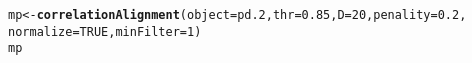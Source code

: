 \documentclass{article}\usepackage[]{graphicx}\usepackage[]{color}
\makeatletter
\newcommand{\hlnum}[1]{\textcolor[rgb]{0.686,0.059,0.569}{#1}}%
\newcommand{\hlstd}[1]{\textcolor[rgb]{0.345,0.345,0.345}{#1}}%
\newcommand{\hlkwb}[1]{\textcolor[rgb]{0.69,0.353,0.396}{#1}}%
\newcommand{\hlkwc}[1]{\textcolor[rgb]{0.333,0.667,0.333}{#1}}%
\newcommand{\hlkwd}[1]{\textcolor[rgb]{0.737,0.353,0.396}{\textbf{#1}}}%
\newenvironment{kframe}{%
 \def\at@end@of@kframe{}%
 \ifinner\ifhmode%
  \def\at@end@of@kframe{\end{minipage}}%
  \begin{minipage}{\columnwidth}%
 \fi\fi%
 \def\FrameCommand##1{\hskip\@totalleftmargin \hskip-\fboxsep
 \colorbox{shadecolor}{##1}\hskip-\fboxsep
     \hskip-\linewidth \hskip-\@totalleftmargin \hskip\columnwidth}%
 \MakeFramed {\advance\hsize-\width
   \@totalleftmargin\z@ \linewidth\hsize
   \@setminipage}}%
 {\par\unskip\endMakeFramed%
 \at@end@of@kframe}
\newenvironment{knitrout}{}{} %
\makeatother
\begin{document}
\begin{knitrout}
\color{fgcolor}\begin{kframe}
\begin{alltt}
\hlstd{mp} \hlkwb{<-} \hlkwd{correlationAlignment}\hlstd{(}\hlkwc{object}\hlstd{=pd.2,} \hlkwc{thr}\hlstd{=}\hlnum{0.85}\hlstd{,} \hlkwc{D}\hlstd{=}\hlnum{20}\hlstd{,} \hlkwc{penality}\hlstd{=}\hlnum{0.2}\hlstd{,}
                           \hlkwc{normalize}\hlstd{=}\hlnum{TRUE}\hlstd{,} \hlkwc{minFilter}\hlstd{=}\hlnum{1}\hlstd{)}
\hlstd{mp}
\end{alltt}
\end{kframe}
\end{knitrout}


\end{document}
